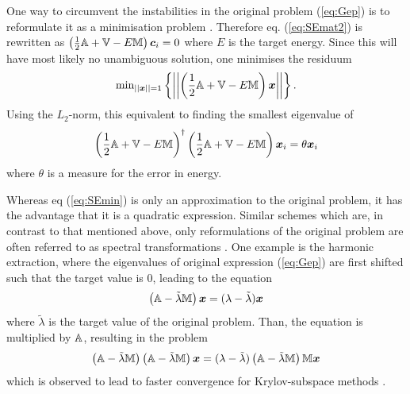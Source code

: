 One way to circumvent the instabilities in the original problem (\ref{eq:Gep}) is to reformulate it as a minimisation problem \cite{H2pDeCleva}.
Therefore eq. (\ref{eq:SEmat2}) is rewritten as $\left(\frac 12 \mathbb{A}+\mathbb{V} - E \mathbb{M}\right)\bm{c}_i = 0$ where $E$ is the target energy.
Since this will have most likely no unambiguous solution, one minimises the residuum
\begin{equation}
\text{min}_{||\bm{x}||=1}\left\{\left|\left|\left(\frac 12 \mathbb{A}+\mathbb{V}-E\mathbb{M}\right)\bm{x} \right|\right| \right\}.
\end{equation}
Using the $L_2$-norm, this equivalent to finding the smallest eigenvalue of
\begin{equation} \label{eq:SEmin}
\left(\frac 12 \mathbb{A}+\mathbb{V}-E\mathbb{M}\right)^\dagger
\left(\frac 12 \mathbb{A}+\mathbb{V}-E\mathbb{M}\right) \bm{x}_i = \theta \bm{x}_i
\end{equation}
where $\theta$ is a measure for the error in energy.
%

Whereas eq (\ref{eq:SEmin}) is only an approximation to the original problem, it has the advantage that it is a quadratic expression.
Similar schemes which are, in contrast to that mentioned above, only reformulations of the original problem are often referred to as spectral transformations \cite{slepcManual}.
One example is the harmonic extraction, where the eigenvalues of original expression (\ref{eq:Gep}) are first shifted such that the target value is $0$, leading to the equation 
\begin{equation} \label{eq:Shift}
\left(\mathbb{A}-\tilde{\lambda}\mathbb{M}\right)\bm{x}=(\lambda-\tilde{\lambda})\bm{x}
\end{equation}
where $\tilde{\lambda}$ is the target value of the original problem.
Than, the equation is multiplied by $\mathbb{A}$, resulting in the problem 
\begin{equation}
\left(\mathbb{A}-\tilde{\lambda}\mathbb{M}\right)\left(\mathbb{A}-\tilde{\lambda}\mathbb{M}\right)\bm{x}=(\lambda-\tilde{\lambda})\left(\mathbb{A}-\tilde{\lambda}\mathbb{M}\right)\mathbb{M}\bm{x}
\end{equation}
which is observed to lead to faster convergence for Krylov-subspace methods \cite{slepcManual}.

